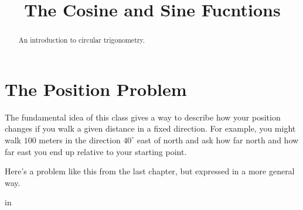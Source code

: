 \documentclass{ximera}
\title{The Cosine and Sine Fucntions}
\newcommand{\pskip}{\vskip 0.1 in}
\begin{document}
\begin{abstract}
An introduction to circular trigonometry.
\end{abstract}
\maketitle

\section{The Position Problem}

The fundamental idea of this class gives a way to describe how your position changes if you walk a given distance in a fixed direction. For example, you might walk $100$ meters in the direction $40^\circ$ east of north and ask how far north and how far east you end up relative to your starting point.

Here's a problem like this from the last chapter, but expressed in a more general way.

\pskip
\end{document}
